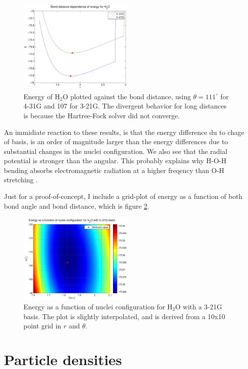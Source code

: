 \documentclass[a4paper,10pt, twocolumn, pre]{revtex4}
\begin{document}
\begin{figure}
\includegraphics[width=0.5\textwidth]{figures/H2O_distance_energy.pdf}
\caption{Energy of H$_2$O plotted against the bond distance, using $\theta=111^\circ$ for 4-31G and 107 for 3-21G. The divergent behavior for long distances is because the Hartree-Fock solver did not converge.}
\label{fig:distanceh2o}
\end{figure}

An immidiate reaction to these results, is that the energy difference du to chage of basis, is an order of magnitude larger than the energy differences due to substantial changes in the nuclei configuration. We also see that the radial potential is stronger than the angular. This probably explains why H-O-H bending absorbs electromagnetic radiation at a higher freqency than O-H stretching \cite{Wikipedia}.

Just for a proof-of-concept, I include a grid-plot of energy as a function of both bond angle and bond distance, which is figure \ref{fig:configh2o}.

\begin{figure}
\includegraphics[width=0.5\textwidth]{figures/H2Oconfig_321g.pdf}
\caption{Energy as a function of nuclei configuration for H$_2$O with a 3-21G basis. The plot is slightly interpolated, and is derived from a 10x10 point grid in $r$ and $\theta$.}
\label{fig:configh2o}
\end{figure}


\section{Particle densities}
\end{document}
